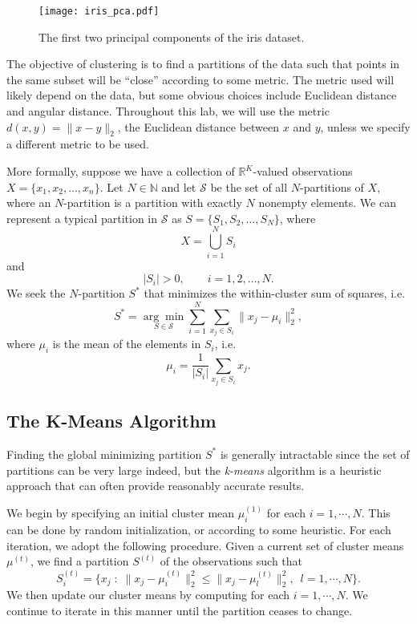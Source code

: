 \begin{figure}
\centering
\texttt{[image: iris\_pca.pdf]}
\caption{The first two principal components of the iris dataset.}
\label{fig:iris_data}
\end{figure}

The objective of clustering is to find a partitions of the data such that points in the same subset will be ``close'' according to some metric.
The metric used will likely depend on the data, but some obvious choices include Euclidean distance and angular distance.
Throughout this lab, we will use the metric $d(x,y) = \|x-y\|_2$, the Euclidean distance between $x$ and $y$, unless we specify a different metric to be used.

More formally, suppose we have a collection of $\mathbb{R}^K$-valued observations $X = \{x_1,x_2,\ldots,x_n\}$.
Let $N \in \mathbb{N}$ and let $\mathcal{S}$ be the set of all $N$-partitions of $X$, where an $N$-partition is a partition with exactly $N$ nonempty elements.
We can represent a typical partition in $\mathcal{S}$ as $S = \{S_1,S_2,\ldots,S_N\}$, where
\[
X = \bigcup_{i=1}^N S_i
\]
and
\[
|S_i| > 0, \qquad i=1,2,\ldots,N.
\]
We seek the $N$-partition $S^*$ that minimizes the within-cluster sum of squares, i.e.
\[
S^* = \underset{S\in\mathcal{S}}{\arg\min} \sum_{i=1}^N\sum_{x_j\in S_i}\|x_j-\mu_i\|_2^2,
\]
where $\mu_i$ is the mean of the elements in $S_i$, i.e.
\[
\mu_i = \frac{1}{|S_i|}\sum_{x_j\in S_i}x_j.
\]

\subsection*{The K-Means Algorithm}

Finding the global minimizing partition $S^*$ is generally intractable since the set of partitions can be very large indeed,
but the \emph{k-means} algorithm is a heuristic approach that can often provide reasonably accurate results.


We begin by specifying an initial cluster mean $\mu_i^{(1)}$ for each $i = 1, \cdots, N$. 
This can be done by random initialization, or according to some heuristic.
For each iteration, we adopt the following procedure.
Given a current set of cluster means $\mu^{(t)}$, we find a partition $S^{(t)}$ of the observations such that
\begin{equation*}
S_{i}^{(t)} = \{x_j \; : \; \|x_j - \mu_{i}^{(t)}\|_2^2 \leq \|x_j - \mu_{l}^{(t)}\|_2^2,\,\,\,  l = 1, \cdots, N\}.
\end{equation*}
We then update our cluster means by computing for each $i = 1, \cdots, N$.
We continue to iterate in this manner until the partition ceases to change.


